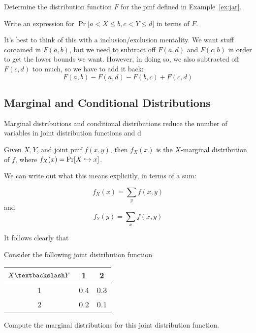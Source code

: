\documentclass[../main.tex]{subfiles}
\begin{document}
\begin{example}
Determine the distribution function $F$ for the pmf defined in Example~\ref{ex:jar}. 
\end{example}
\begin{example}
Write an expression for $\Pr[a<X\leq b, c< Y \leq d$] in terms of $F$. %
\end{example}
\begin{solution}
It's best to think of this with a inclusion/exclusion mentality. We want stuff contained in $F(a, b)$, but we need to subtract off $F(a, d)$ and $F(c, b)$ in order to get the lower bounds we want. However, in doing so, we also subtracted off $F(c, d)$ too much, so we have to add it back: 
\[
    F(a, b) - F(a, d) - F(b, c) + F(c, d)
\]
\end{solution}

\subsection{Marginal and Conditional Distributions}
Marginal distributions and conditional distributions reduce the number of variables in joint distribution functions and d

\begin{definition}
Given $X, Y$, and joint pmf $f(x,y)$, then $f_X(x)$ is the $X$-marginal distribution of $f$, where $f_X(x) = \mathrm{Pr}[X \hookrightarrow x]$. 
\end{definition}
We can write out what this means explicitly, in terms of a sum:
\begin{theorem}
\[
    f_X(x) = \sum_y f(x,y)
\]
and 
\[
    f_Y(y) = \sum_x f(x,y)
\]
\end{theorem}
It follows clearly that 
\begin{example}
Consider the following joint distribution function
\begin{center}
    \begin{tabular}{c|cc}
        $X\textbackslash Y$ & 1 & 2  \\ \hline
        1 & 0.4 & 0.3 \\
        2 & 0.2 & 0.1 \\
    \end{tabular}
\end{center}
Compute the marginal distributions for this joint distribution function. 
\end{example}
\end{document}
